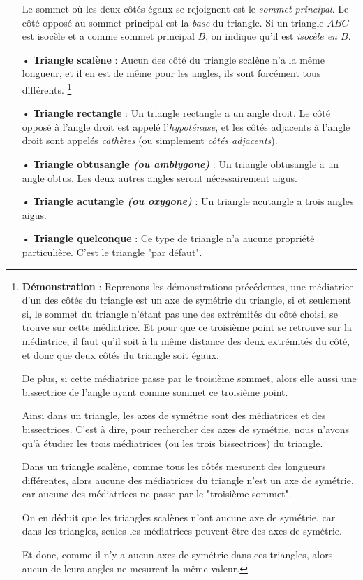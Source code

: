 \documentclass[a4paper, twoside]{article}
\begin{document}
\begin{itemize}
{		      \smallbreak
		  } Le sommet où les deux côtés égaux se rejoignent est le \emph{sommet principal}.
		  Le côté opposé au sommet principal est la \emph{base} du triangle.
		  Si un triangle $ABC$ est isocèle et a comme sommet principal $B$,
		  on indique qu'il est \textit{isocèle en $B$}.
	\item[•] \textbf{Triangle scalène} : Aucun des côté du triangle scalène n'a la même longueur,
	      et il en est de même pour les angles, ils sont forcément tous différents. \footnote{
		      \textbf{Démonstration} : Reprenons les démonstrations précédentes,
		      une médiatrice d'un des côtés du triangle est un axe de symétrie du triangle,
		      si et seulement si, le sommet du triangle n'étant pas une des extrémités du côté choisi,
		      se trouve sur cette médiatrice. Et pour que ce troisième point se retrouve sur la médiatrice,
		      il faut qu'il soit à la même distance des deux extrémités du côté,
		      et donc que deux côtés du triangle soit égaux.

		      De plus, si cette médiatrice passe par le troisième sommet,
		      alors elle aussi une bissectrice de l'angle ayant comme sommet ce troisième point.

		      Ainsi dans un triangle, les axes de symétrie sont des médiatrices et des bissectrices.
		      C'est à dire, pour rechercher des axes de symétrie, nous n'avons qu'à étudier les trois
		      médiatrices (ou les trois bissectrices) du triangle.

		      Dans un triangle scalène, comme tous les côtés mesurent des longueurs différentes,
		      alors aucune des médiatrices du triangle n'est un axe de symétrie,
		      car aucune des médiatrices ne passe par le "troisième sommet".

		      On en déduit que les triangles scalènes n'ont aucune axe de symétrie,
		      car dans les triangles, seules les médiatrices peuvent être des axes de symétrie.

		      Et donc, comme il n'y a aucun axes de symétrie dans ces triangles,
		      alors aucun de leurs angles ne mesurent la même valeur.
	      }

	      \bigbreak

	\item[•] \textbf{Triangle rectangle} : Un triangle rectangle a un angle droit.
	      Le côté opposé à l'angle droit est appelé l'\emph{hypoténuse},
	      et les côtés adjacents à l'angle droit sont appelés \emph{cathètes} (ou simplement \textit{côtés adjacents}).
	\item[•] \textbf{Triangle obtusangle \textit{(ou amblygone)}} : Un triangle obtusangle a un angle obtus.
	      Les deux autres angles seront nécessairement aigus.
	\item[•] \textbf{Triangle acutangle \textit{(ou oxygone)}} : Un triangle acutangle a trois angles aigus.

	      \bigbreak

	\item[•] \textbf{Triangle quelconque} : Ce type de triangle n'a aucune propriété particulière. C'est le triangle "par défaut".
\end{itemize}
\end{document}
